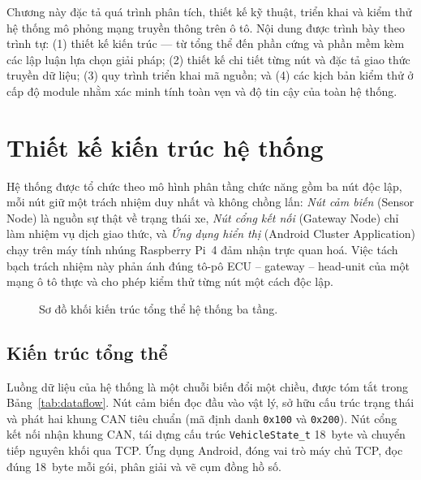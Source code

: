 \documentclass[../DoAn.tex]{subfiles}
\begin{document}

Chương này đặc tả quá trình phân tích, thiết kế kỹ thuật, triển khai và kiểm
thử hệ thống mô phỏng mạng truyền thông trên ô tô. Nội dung được trình bày
theo trình tự: (1) thiết kế kiến trúc — từ tổng thể đến phần cứng và phần mềm
kèm các lập luận lựa chọn giải pháp; (2) thiết kế chi tiết từng nút và đặc tả
giao thức truyền dữ liệu; (3) quy trình triển khai mã nguồn; và (4) các kịch
bản kiểm thử ở cấp độ module nhằm xác minh tính toàn vẹn và độ tin cậy của
toàn hệ thống.

\section{Thiết kế kiến trúc hệ thống}
\label{section:4.1}

Hệ thống được tổ chức theo mô hình phân tầng chức năng gồm ba nút độc lập,
mỗi nút giữ một trách nhiệm duy nhất và không chồng lấn: \textit{Nút cảm biến}
(Sensor Node) là nguồn sự thật về trạng thái xe, \textit{Nút cổng kết nối}
(Gateway Node) chỉ làm nhiệm vụ dịch giao thức, và \textit{Ứng dụng hiển thị}
(Android Cluster Application) chạy trên máy tính nhúng Raspberry Pi~4 đảm nhận
trực quan hoá. Việc tách bạch trách nhiệm này phản ánh đúng tô-pô ECU --
gateway -- head-unit của một mạng ô tô thực và cho phép kiểm thử từng nút một
cách độc lập.

\begin{figure}[H]
  \centering
  \caption{Sơ đồ khối kiến trúc tổng thể hệ thống ba tầng.}
  \label{fig:arch-overview}
\end{figure}

\subsection{Kiến trúc tổng thể}
\label{section:4.1.1}

Luồng dữ liệu của hệ thống là một chuỗi biến đổi một chiều, được tóm tắt trong
Bảng~\ref{tab:dataflow}. Nút cảm biến đọc đầu vào vật lý, sở hữu cấu trúc trạng
thái và phát hai khung CAN tiêu chuẩn (mã định danh \texttt{0x100} và
\texttt{0x200}). Nút cổng kết nối nhận khung CAN, tái dựng cấu trúc
\texttt{VehicleState\_t} 18~byte và chuyển tiếp nguyên khối qua TCP. Ứng dụng
Android, đóng vai trò máy chủ TCP, đọc đúng 18~byte mỗi gói, phân giải và vẽ
cụm đồng hồ số.
\end{document}
